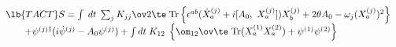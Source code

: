 \begin{equation}
\begin{array}{l}
\lb{TACT}
S= \int \;dt\; \sum_j {K_{jj}\ov 2\te}\; {\rm Tr} 
\left\{ \epsilon^{ab} (\dot{X}_a^{(j)} + 
i [A_0,~ X_a^{(j)}]) X_b^{(j)} 
+ 2\theta A_0 -\omega_j (X_a^{(j)}) ^2 \right\} \\
\ \ \ \ \ \
+  \psi^{(j)\dag}(i \dot{\psi}^{(j)} - A_0\psi^{(j)})
+ \int dt\; K_{12}\; \left\{ {\om_{12}\ov\te}\;
{\rm Tr}(X_a^{(1)}X_a^{(2)})
+  \psi^{(1)}\psi^{(2)} \right\}
\end{array}
\end{equation}


